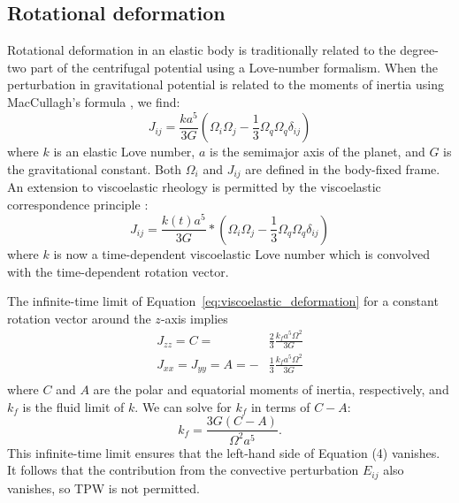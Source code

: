 \documentclass[preprint,12pt,authoryear]{elsarticle}
\begin{document}
\subsection{Rotational deformation}
\label{sec:rotational_deformation}

Rotational deformation in an elastic body is traditionally related to the degree-two part of the 
centrifugal potential using a Love-number formalism. When the perturbation in gravitational
potential is related to the moments of inertia using MacCullagh's formula  \citep{munk1960rotation}, we find:
\begin{equation}
J_{ij} = \frac{k a^5}{3 G} \left( \Omega_i \Omega_j - \frac{1}{3} \Omega_q \Omega_q \delta_{ij} \right)
\label{eq:elastic_deformation}
\end{equation}
where $k$ is an elastic Love number, $a$ is the semimajor axis of the planet, and $G$ is the gravitational constant. Both $\Omega_i$ and
$J_{ij}$ are defined in the body-fixed frame. An extension to  viscoelastic rheology is permitted by the viscoelastic correspondence principle \citep[e.g.][]{peltier1974impulse}:
\begin{equation}
J_{ij} = \frac{k(t) a^5}{3 G} * \left( \Omega_i \Omega_j - \frac{1}{3} \Omega_q \Omega_q \delta_{ij} \right)
\label{eq:viscoelastic_deformation}
\end{equation}
where $k$ is now a time-dependent viscoelastic Love number which is convolved with the time-dependent rotation vector.

The infinite-time limit of Equation~\eqref{eq:viscoelastic_deformation} for a 
constant rotation vector around the $z$-axis implies
\begin{equation}
\begin{aligned}
J_{zz} = C = &\frac{2}{3} \frac{k_f a^5 \Omega^2}{3 G} \\
J_{xx} = J_{yy} = A = -&\frac{1}{3} \frac{k_f a^5 \Omega^2}{3 G} \\
\end{aligned}
\end{equation}
where $C$ and $A$ are the polar and equatorial moments of inertia, respectively, 
and $k_f$ is the fluid limit of $k$. 
We can solve for $k_f$ in terms of $C-A$:
\begin{equation}
k_f = \frac{3 G (C-A)}{\Omega^2 a^5}.
\label{eq:fluid_love}
\end{equation}
This infinite-time limit  ensures that the left-hand side of Equation (4) vanishes. It follows that the contribution from the convective perturbation $E_{ij}$ also vanishes, so TPW is not permitted.
\end{document}

